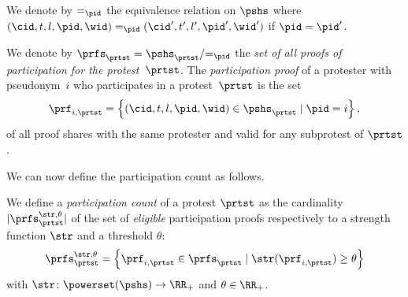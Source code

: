 We denote by \(=_{\pid}\) the equivalence relation on \(\pshs\) where \((\cid, 
t, l, \pid, \wid) =_{\pid} (\cid', t', l', \pid', \wid')\) if \(\pid = \pid'\).

\begin{definition}%
  \label{DefParticipationProof}\label{DefParticipationProofs}
  We denote by \(\prfs_{\prtst} = \pshs_{\prtst}/{=_{\pid}}\) the \emph{set of 
  all proofs of participation for the protest~\(\prtst\)}.
  The \emph{participation proof} of a protester with pseudonym~\(i\) who 
  participates in a protest~\(\prtst\) is the set
  \begin{equation}
    \nonumber
    \prf_{i, \prtst} =
    \left\{ (\cid, t, l, \pid, \wid) \in \pshs_{\prtst} \mid
      \pid = i\right\},
  \end{equation}
  of all proof shares with the same protester and valid for any subprotest of 
  \(\prtst\).
\end{definition}


We can now define the participation count as follows.
\begin{definition}%
  \label{DefParticipationCount}
  We define a \emph{participation count} of a protest \(\prtst\) as the cardinality 
  \(|\prfs_{\prtst}^{\str,\theta}|\) of the set of \emph{eligible} participation proofs respectively to a strength function $\str$ and a threshold $\theta$: \[
    \prfs_{\prtst}^{\str,\theta} = \left\{ \prf_{i,\prtst} \in \prfs_{\prtst}
      \mid
      \str(\prf_{i,\prtst})\geq \theta \right\}
  \] with \(\str\colon \powerset(\pshs)\to \RR_+\) and  \(\theta \in \RR_+\).
\end{definition}

